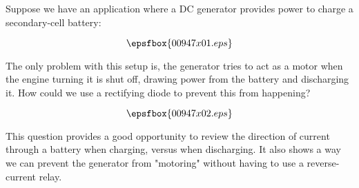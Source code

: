 

Suppose we have an application where a DC generator provides power to charge a secondary-cell battery:

$$\epsfbox{00947x01.eps}$$

The only problem with this setup is, the generator tries to act as a motor when the engine turning it is shut off, drawing power from the battery and discharging it.  How could we use a rectifying diode to prevent this from happening?







$$\epsfbox{00947x02.eps}$$







This question provides a good opportunity to review the direction of current through a battery when charging, versus when discharging.  It also shows a way we can prevent the generator from "motoring" without having to use a reverse-current relay.




